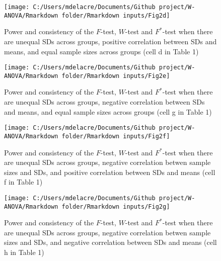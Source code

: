 \documentclass[
  english,
  man]{apa6}
\begin{document}
\newpage
\begin{landscape}

\begin{figure}

{\centering \texttt{[image: C:/Users/mdelacre/Documents/Github project/W-ANOVA/Rmarkdown folder/Rmarkdown inputs/Fig2d]} 

}

\caption{Power and consistency of the $F$-test, $W$-test and $F^*$-test when there are unequal SDs across groups, positive correlation between SDs and means, and equal sample sizes across groups (cell d in Table 1)}\label{fig:Fig13}
\end{figure}

\end{landscape}
\newpage
\begin{landscape}

\begin{figure}

{\centering \texttt{[image: C:/Users/mdelacre/Documents/Github project/W-ANOVA/Rmarkdown folder/Rmarkdown inputs/Fig2e]} 

}

\caption{Power and consistency of the $F$-test, $W$-test and $F^*$-test when there are unequal SDs across groups, negative correlation between SDs and means, and equal sample sizes across groups (cell g in Table 1)}\label{fig:Fig14}
\end{figure}

\end{landscape}
\newpage
\begin{landscape}

\begin{figure}

{\centering \texttt{[image: C:/Users/mdelacre/Documents/Github project/W-ANOVA/Rmarkdown folder/Rmarkdown inputs/Fig2f]} 

}

\caption{Power and consistency of the $F$-test, $W$-test and $F^*$-test when there are unequal SDs across groups, negative correlation betwen sample sizes and SDs, and positive correlation between SDs and means (cell f in Table 1)}\label{fig:Fig15}
\end{figure}

\end{landscape}
\newpage
\begin{landscape}

\begin{figure}

{\centering \texttt{[image: C:/Users/mdelacre/Documents/Github project/W-ANOVA/Rmarkdown folder/Rmarkdown inputs/Fig2g]} 

}

\caption{Power and consistency of the $F$-test, $W$-test and $F^*$-test when there are unequal SDs across groups, negative correlation betwen sample sizes and SDs, and negative correlation between SDs and means (cell h in Table 1)}\label{fig:Fig16}
\end{figure}

\end{landscape}
\end{document}
